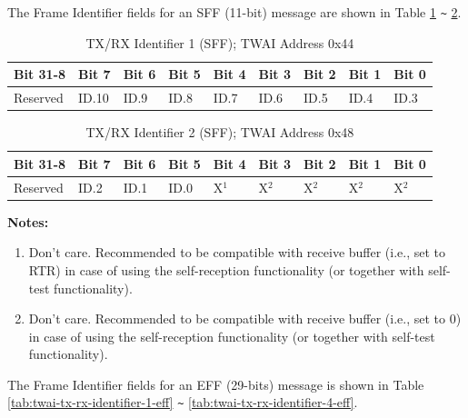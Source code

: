 \documentclass[main\_\_EN.tex]{subfiles}
\begin{document}
The Frame Identifier fields for an SFF (11-bit) message are shown in Table \ref{tab:twai-tx-rx-identifier-1-sff} \verb+~+ \ref{tab:twai-tx-rx-identifier-2-sff}.

\begin{longtable}[c]{|p{1.4cm}|p{1.4cm}|p{1.4cm}|p{1.4cm}|p{1.4cm}|p{1.4cm}|p{1.4cm}|p{1.4cm}|p{1.4cm}|}
    \caption{TX/RX Identifier 1 (SFF); TWAI Address 0x44}
    \label{tab:twai-tx-rx-identifier-1-sff}\\
    \hline
    \rowcolor{lightgray}
    \textbf{Bit 31-8} & \textbf{Bit 7} & \textbf{Bit 6} & \textbf{Bit 5} & \textbf{Bit 4} & \textbf{Bit 3} & \textbf{Bit 2} & \textbf{Bit 1} & \textbf{Bit 0}\\\hline

    Reserved & ID.10 & ID.9 & ID.8 & ID.7 & ID.6 & ID.5 & ID.4 & ID.3\\
    \hline
\end{longtable}

\begin{longtable}[c]{|p{1.4cm}|p{1.4cm}|p{1.4cm}|p{1.4cm}|p{1.4cm}|p{1.4cm}|p{1.4cm}|p{1.4cm}|p{1.4cm}|}
    \caption{TX/RX Identifier 2 (SFF); TWAI Address 0x48}
    \label{tab:twai-tx-rx-identifier-2-sff}\\
    \hline
       \rowcolor{lightgray}
    \textbf{Bit 31-8} & \textbf{Bit 7} & \textbf{Bit 6} & \textbf{Bit 5} & \textbf{Bit 4} & \textbf{Bit 3} & \textbf{Bit 2} & \textbf{Bit 1} & \textbf{Bit 0}\\\hline
    Reserved & ID.2 & ID.1 & ID.0 & X$^1$ & X$^2$ & X$^2$ & X$^2$ & X$^2$\\
    \hline
\end{longtable}
\vspace{-1.5em}
{\bfseries Notes:}\\
\begin{enumerate}
    \item Don't care. Recommended to be compatible with receive buffer (i.e., set to RTR) in case of using the self-reception functionality (or together with self-test functionality).
    \item Don't care. Recommended to be compatible with receive buffer (i.e., set to 0) in case of using the self-reception functionality (or together with self-test functionality).
\end{enumerate}


The Frame Identifier fields for an EFF (29-bits) message is shown in Table \ref{tab:twai-tx-rx-identifier-1-eff} \verb+~+ \ref{tab:twai-tx-rx-identifier-4-eff}.
\end{document}
